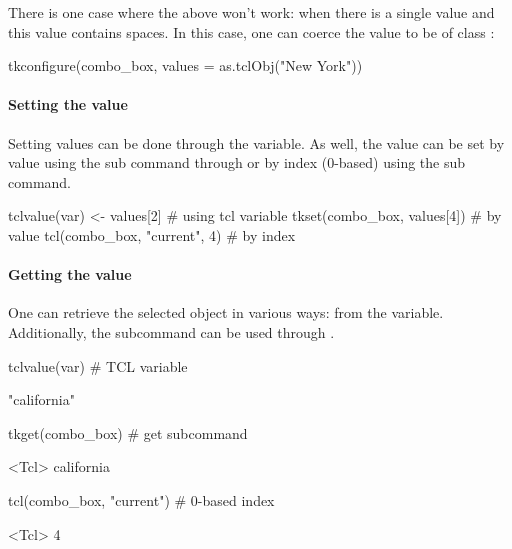 There is one case where the above won't work: when there is a single
value and this value contains spaces. In this case, one can coerce the
value to be of class :
\begin{Schunk}
\begin{Sinput}
 tkconfigure(combo_box, values = as.tclObj("New York"))
\end{Sinput}
\end{Schunk}

\paragraph{Setting the value}
Setting values can be done through the \TCL\/ variable. As well, the
value can be set by value using the  sub
command through  or by index (0-based) using the
 sub command.

\begin{Schunk}
\begin{Sinput}
 tclvalue(var) <- values[2]            # using tcl variable
 tkset(combo_box, values[4])           # by value
 tcl(combo_box, "current", 4)          # by index
\end{Sinput}
\end{Schunk}


\paragraph{Getting the value}
One can retrieve the selected object in various ways: from the \TCL\/
variable. Additionally, the  subcommand
can be used through .

\begin{Schunk}
\begin{Sinput}
 tclvalue(var)                           # TCL variable
\end{Sinput}
\begin{Soutput}
[1] "california"
\end{Soutput}
\begin{Sinput}
 tkget(combo_box)                        # get subcommand
\end{Sinput}
\begin{Soutput}
<Tcl> california 
\end{Soutput}
\begin{Sinput}
 tcl(combo_box, "current")               # 0-based index
\end{Sinput}
\begin{Soutput}
<Tcl> 4 
\end{Soutput}
\end{Schunk}


